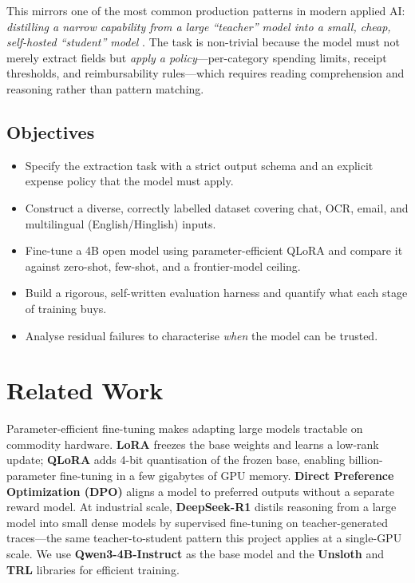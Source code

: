 \documentclass[conference]{IEEEtran}
\begin{document}
This mirrors one of the most common production patterns in modern applied AI:
\emph{distilling a narrow capability from a large ``teacher'' model into a
small, cheap, self-hosted ``student'' model} \cite{deepseek}. The task is
non-trivial because the model must not merely extract fields but \emph{apply a
policy}---per-category spending limits, receipt thresholds, and reimbursability
rules---which requires reading comprehension and reasoning rather than pattern
matching.

\subsection*{Objectives}
\begin{itemize}
  \item Specify the extraction task with a strict output schema and an
        explicit expense policy that the model must apply.
  \item Construct a diverse, correctly labelled dataset covering chat, OCR,
        email, and multilingual (English/Hinglish) inputs.
  \item Fine-tune a 4B open model using parameter-efficient QLoRA and compare
        it against zero-shot, few-shot, and a frontier-model ceiling.
  \item Build a rigorous, self-written evaluation harness and quantify what
        each stage of training buys.
  \item Analyse residual failures to characterise \emph{when} the model can be
        trusted.
\end{itemize}

\section{Related Work}
Parameter-efficient fine-tuning makes adapting large models tractable on
commodity hardware. \textbf{LoRA} \cite{lora} freezes the base weights and learns
a low-rank update; \textbf{QLoRA} \cite{qlora} adds 4-bit quantisation of the
frozen base, enabling billion-parameter fine-tuning in a few gigabytes of GPU
memory. \textbf{Direct Preference Optimization (DPO)} \cite{dpo} aligns a model
to preferred outputs without a separate reward model. At industrial scale,
\textbf{DeepSeek-R1} \cite{deepseek} distils reasoning from a large model into
small dense models by supervised fine-tuning on teacher-generated traces---the
same teacher-to-student pattern this project applies at a single-GPU scale. We
use \textbf{Qwen3-4B-Instruct} \cite{qwen} as the base model and the
\textbf{Unsloth} \cite{unsloth} and \textbf{TRL} \cite{trl} libraries for
efficient training.
\end{document}
